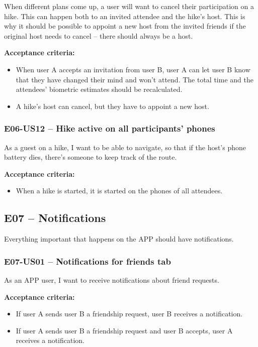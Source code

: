 When different plans come up, a user will want to cancel their participation on a hike.
This can happen both to an invited attendee and the hike's host.
This is why it should be possible to appoint a new host from the invited friends if the original host needs to cancel -- there should always be a host.

\textbf{Acceptance criteria:}
\begin{itemize}
    \item When user A accepts an invitation from user B, user A can let user B know that they have changed their mind and won't attend. The total time and the attendees' biometric estimates should be recalculated.
    \item A hike's host can cancel, but they have to appoint a new host.
\end{itemize}

\subsubsection*{E06-US12 -- Hike active on all participants' phones}
As a guest on a hike, I want to be able to navigate, so that if the host's phone battery dies, there's someone to keep track of the route.

\textbf{Acceptance criteria:}
\begin{itemize}
    \item When a hike is started, it is started on the phones of all attendees.
\end{itemize}

\subsection*{E07 -- Notifications}
Everything important that happens on the APP should have notifications.

\subsubsection*{E07-US01 -- Notifications for friends tab}
As an APP user, I want to receive notifications about friend requests.

\textbf{Acceptance criteria:}
\begin{itemize}
    \item If user A sends user B a friendship request, user B receives a notification.
    \item If user A sends user B a friendship request and user B accepts, user A receives a notification.
\end{itemize}

